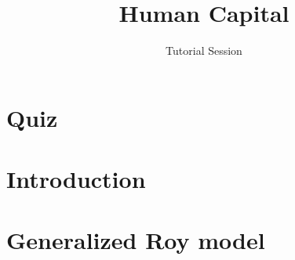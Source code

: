 
\title{Human Capital}
\subtitle{Tutorial Session}
\date{}


\maketitle
\setcounter{page}{1}
\thispagestyle{empty}

\vspace{0.5cm}\tableofcontents\clearpage

\section{Quiz}
\FloatBarrier\newpage

\section{Introduction}
\FloatBarrier\newpage

\section{Generalized Roy model}
\FloatBarrier\newpage




